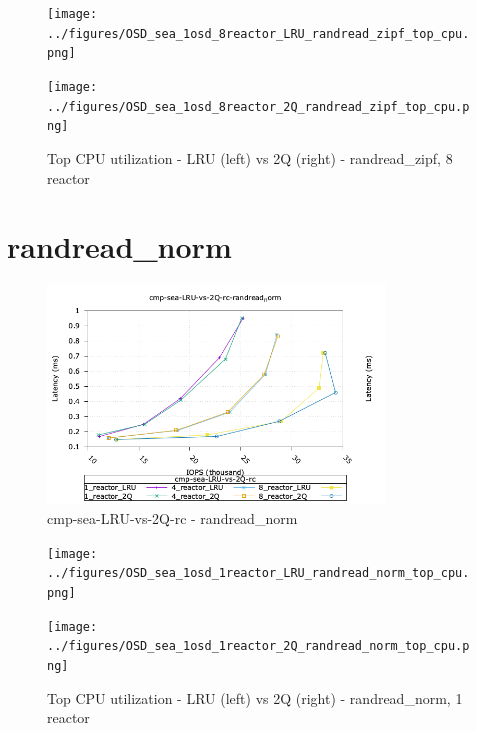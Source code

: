 \begin{figure}[!ht]
  \centering
  \begin{minipage}{.5\textwidth}
  \centering
    \texttt{[image: ../figures/OSD\_sea\_1osd\_8reactor\_LRU\_randread\_zipf\_top\_cpu.png]}
  \end{minipage}%
  \begin{minipage}{.5\textwidth}
  \centering
    \texttt{[image: ../figures/OSD\_sea\_1osd\_8reactor\_2Q\_randread\_zipf\_top\_cpu.png]}
  \end{minipage}%
  \caption{Top CPU utilization - LRU (left) vs 2Q (right) - randread\_zipf, 8 reactor}
  \label{figure:8-reactor-cpu-randread_zipf}
\end{figure}


\pagebreak
\section{randread\_norm}

\begin{figure}[!ht]
\centering
\includegraphics[width=0.8\textwidth]{../figures/cmp_sea_LRU_vs_2Q_rc_randread_norm_iops_vs_lat.png}
\caption{cmp-sea-LRU-vs-2Q-rc - randread\_norm}
\label{fig:cmp_sea_LRU_vs_2Q_rc_randread_norm}
\end{figure}

\begin{figure}[!ht]
  \centering
  \begin{minipage}{.5\textwidth}
  \centering
    \texttt{[image: ../figures/OSD\_sea\_1osd\_1reactor\_LRU\_randread\_norm\_top\_cpu.png]}
  \end{minipage}%
  \begin{minipage}{.5\textwidth}
  \centering
    \texttt{[image: ../figures/OSD\_sea\_1osd\_1reactor\_2Q\_randread\_norm\_top\_cpu.png]}
  \end{minipage}%
  \caption{Top CPU utilization - LRU (left) vs 2Q (right) - randread\_norm, 1 reactor}
  \label{figure:1-reactor-cpu-randread_norm}
\end{figure}


